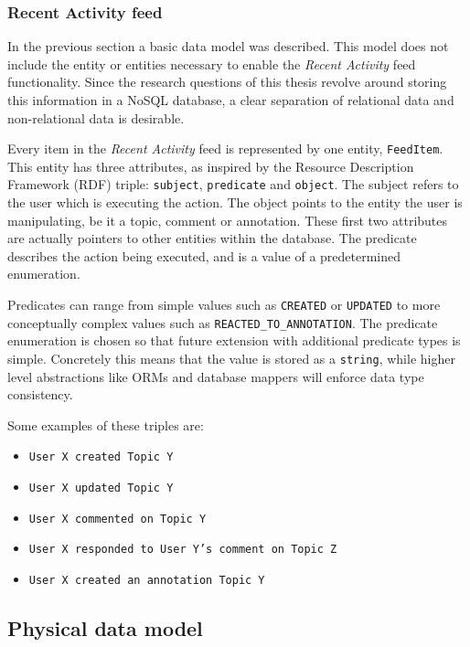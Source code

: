 \subsubsection{Recent Activity feed}
\label{sec:recent-activity-feed}

In the previous section a basic data model was described. This model does not include the entity or entities necessary to enable the \textit{Recent Activity} feed functionality. Since the research questions of this thesis revolve around storing this information in a NoSQL database, a clear separation of relational data and non-relational data is desirable.

Every item in the \textit{Recent Activity} feed is represented by one entity, \texttt{FeedItem}. This entity has three attributes, as inspired by the Resource Description Framework (RDF) triple: \texttt{subject}, \texttt{predicate} and \texttt{object}. The subject refers to the user which is executing the action. The object points to the entity the user is manipulating, be it a topic, comment or annotation. These first two attributes are actually pointers to other entities within the database. The predicate describes the action being executed, and is a value of a predetermined enumeration.

Predicates can range from simple values such as \texttt{CREATED} or \texttt{UPDATED} to more conceptually complex values such as \texttt{REACTED\_TO\_ANNOTATION}. The predicate enumeration is chosen so that future extension with additional predicate types is simple. Concretely this means that the value is stored as a \texttt{string}, while higher level abstractions like ORMs and database mappers will enforce data type consistency.

Some examples of these triples are:

\begin{itemize}
  \item \texttt{User X created Topic Y}
  \item \texttt{User X updated Topic Y}
  \item \texttt{User X commented on Topic Y}
  \item \texttt{User X responded to User Y's comment on Topic Z}
  \item \texttt{User X created an annotation Topic Y}
\end{itemize}

\subsection{Physical data model}
\label{sec:physical-data-model}

